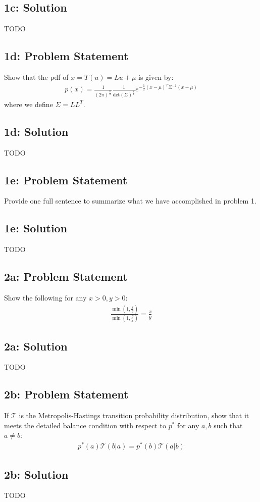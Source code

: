 \documentclass[10pt]{article}
\newcommand{\officialdirections}[1]{{\color{blue} #1}}
\begin{document}
\subsection{1c: Solution}
TODO


 \newpage
\officialdirections{
\subsection*{1d: Problem Statement}
Show that the pdf of $x = T(u) = L u + \mu$ is given by:
\begin{align}
p(x) = \frac{1}{(2\pi)^{\frac{D}{2}}} \frac{1}{\text{det}(\Sigma)^{\frac{1}{2}}} e^{-\frac{1}{2} (x-\mu)^T \Sigma^{-1} (x-\mu)}
\end{align}
where we define $\Sigma = L L^T$. 
}

\subsection{1d: Solution}
TODO

\officialdirections{
\subsection*{1e: Problem Statement}
 Provide one full sentence to summarize what we have accomplished in problem 1.
}

\subsection{1e: Solution}
TODO

\newpage
\officialdirections{
\subsection*{2a: Problem Statement}
Show the following for any $x > 0, y > 0$:
\begin{align}
\frac
  { \min \left( 1, \frac{x}{y} \right) }
  { \min \left( 1, \frac{y}{x} \right) }
=
\frac{x}{y}
\end{align}
}

\subsection{2a: Solution}
TODO

\newpage
\officialdirections{
\subsection*{2b: Problem Statement}
If $\mathcal{T}$ is the Metropolis-Hastings transition probability distribution, show that it meets the detailed balance condition with respect to $p^*$ for any $a,b$ such that $a \neq b$:
\begin{align}
p^*( a) \mathcal{T}( b | a)  = p^*(b) \mathcal{T}( a | b)
\end{align}
}

\subsection{2b: Solution}
TODO
\end{document}
